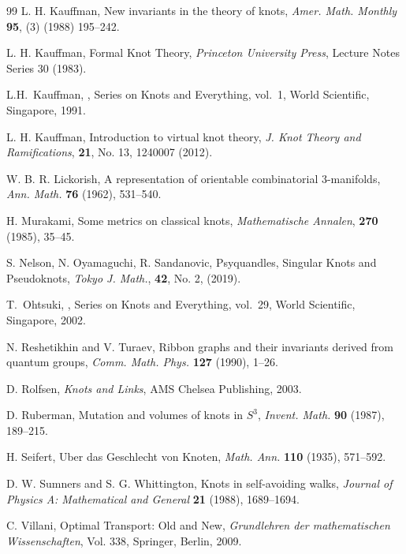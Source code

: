 \documentclass[a4paper, reqno, 12pt]{amsart}
\theoremstyle{plain}
\theoremstyle{definition}
\begin{document}
\begin{thebibliography}{99}
 {\sc L. H. Kauffman}, New invariants in the theory of knots, \emph{Amer. Math. Monthly} {\bf 95}, (3) (1988) 195--242.

 {\sc L. H. Kauffman}, Formal Knot Theory, {\it Princeton University Press}, Lecture Notes Series 30 (1983).

L.H.~Kauffman,
,
\newblock Series on Knots and Everything, vol.~1,
\newblock World Scientific, Singapore, 1991.

 {\sc L. H. Kauffman}, Introduction to virtual knot theory, {\it J. Knot Theory and Ramifications}, {\bf 21}, No. 13, 1240007 (2012).

{\sc W. B. R. Lickorish},
A representation of orientable combinatorial 3-manifolds,
{\it Ann. Math.} {\bf 76} (1962), 531--540.

 {\sc H. Murakami}, Some metrics on classical knots, {\em Mathematische Annalen}, {\bf 270} (1985), 35--45.


 {\sc S. Nelson, N. Oyamaguchi, R. Sandanovic}, Psyquandles, Singular Knots and Pseudoknots, {\it Tokyo J. Math.}, {\bf 42}, No. 2, (2019).


T.~Ohtsuki,
,
\newblock Series on Knots and Everything, vol.~29,
\newblock World Scientific, Singapore, 2002.

{\sc N. Reshetikhin and V. Turaev},
Ribbon graphs and their invariants derived from quantum groups,
{\it Comm. Math. Phys.} {\bf 127} (1990), 1--26.



{\sc D. Rolfsen},
{\em Knots and Links},
AMS Chelsea Publishing, 2003.


{\sc D. Ruberman},
Mutation and volumes of knots in $S^3$,
{\it Invent. Math.} {\bf 90} (1987), 189--215.


{\sc H. Seifert},
Uber das Geschlecht von Knoten,
{\it Math. Ann.} {\bf 110} (1935), 571--592.

 {\sc D. W. Sumners and S. G. Whittington}, Knots in self-avoiding walks, \emph{Journal of Physics A: Mathematical and General} \textbf{21} (1988), 1689--1694.

 {\sc C. Villani}, Optimal Transport: Old and New, {\it Grundlehren der mathematischen Wissenschaften}, Vol. 338, Springer, Berlin, 2009.


\end{thebibliography}
\end{document}

